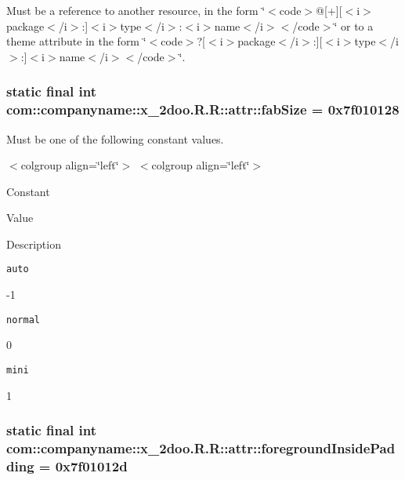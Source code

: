 Must be a reference to another resource, in the form \char`\"{}$<$code$>$@\mbox{[}+\mbox{]}\mbox{[}$<$i$>$package$<$/i$>$:\mbox{]}$<$i$>$type$<$/i$>$:$<$i$>$name$<$/i$>$$<$/code$>$\char`\"{} or to a theme attribute in the form \char`\"{}$<$code$>$?\mbox{[}$<$i$>$package$<$/i$>$:\mbox{]}\mbox{[}$<$i$>$type$<$/i$>$:\mbox{]}$<$i$>$name$<$/i$>$$<$/code$>$\char`\"{}. \hypertarget{classcom_1_1companyname_1_1x__2doo_1_1_r_1_1attr_f2795ff51ff06c73216e6ddece6ad1fc}{
\subsubsection[{fabSize}]{\setlength{\rightskip}{0pt plus 5cm}static final int com::companyname::x\_\-2doo.R.R::attr::fabSize = 0x7f010128}}
\label{classcom_1_1companyname_1_1x__2doo_1_1_r_1_1attr_f2795ff51ff06c73216e6ddece6ad1fc}


Must be one of the following constant values. \begin{TabularC}{0}
\hline
\end{TabularC}
$<$colgroup align=\char`\"{}left\char`\"{}$>$ $<$colgroup align=\char`\"{}left\char`\"{}$>$ 

Constant

Value

Description 

{\tt auto}

-1

{\tt normal}

0

{\tt mini}

1\hypertarget{classcom_1_1companyname_1_1x__2doo_1_1_r_1_1attr_08142423a1f435e5b804bbaa450a4925}{
\subsubsection[{foregroundInsidePadding}]{\setlength{\rightskip}{0pt plus 5cm}static final int com::companyname::x\_\-2doo.R.R::attr::foregroundInsidePadding = 0x7f01012d}}
\label{classcom_1_1companyname_1_1x__2doo_1_1_r_1_1attr_08142423a1f435e5b804bbaa450a4925}


